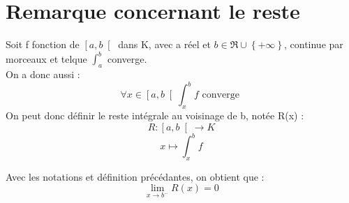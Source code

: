 \section{Remarque concernant le reste}
\begin{de}
Soit f fonction de $\left[a,b\right[$ dans K, avec a réel et $b \in \Re \cup \left\lbrace +\infty \right\rbrace$, continue par morceaux et telque $\int_a^b$ converge.\\
On a donc aussi : 
$$\forall x \in \left[a,b\right[ \int_x^b f \mbox{ converge }$$ 
On peut donc définir le reste intégrale au voisinage de b, notée R(x) :
$$R : \left[a,b\right[ \rightarrow K$$
$$x \mapsto \int_x^b f$$
\end{de}
\begin{prop}
Avec les notations et définition précédantes, on obtient que : 
$$\lim_{x \rightarrow b^-} R(x) = 0$$
\end{prop}
